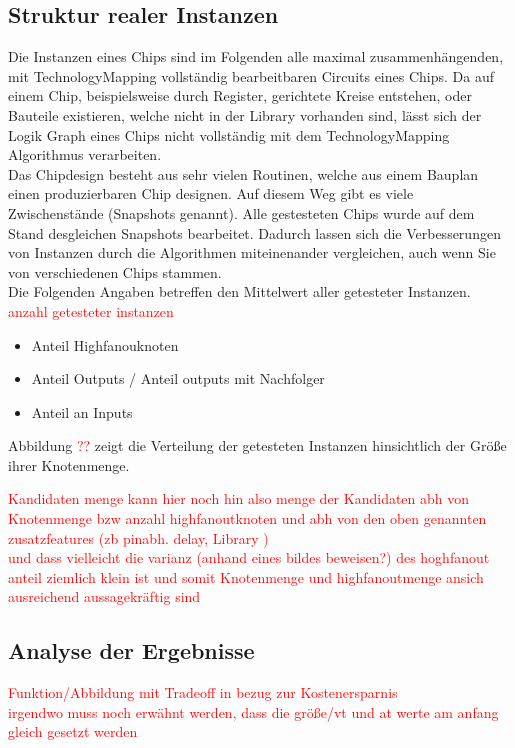 \documentclass[11pt, a4paper, german]{article}
\newcommand{\TM}{TechnologyMapping }
\begin{document}
 \subsection{Struktur realer Instanzen}
\label{subsec:struktur_realer_instanzen} 
 Die Instanzen eines Chips sind im Folgenden alle maximal zusammenhängenden, mit \TM vollständig bearbeitbaren Circuits eines Chips. Da auf einem Chip, beispielsweise durch Register, gerichtete Kreise entstehen, oder Bauteile existieren, welche nicht in der Library vorhanden sind, lässt sich der Logik Graph eines Chips nicht vollständig mit dem \TM Algorithmus verarbeiten. \\
 Das Chipdesign besteht aus sehr vielen Routinen, welche aus einem Bauplan einen produzierbaren Chip designen. Auf diesem Weg gibt es viele Zwischenstände (Snapshots genannt). Alle gestesteten Chips wurde auf dem Stand  desgleichen Snapshots bearbeitet. Dadurch lassen sich die Verbesserungen von Instanzen durch die Algorithmen miteinenander vergleichen, auch wenn Sie von verschiedenen Chips stammen.\\
 Die Folgenden Angaben betreffen den Mittelwert aller getesteter Instanzen. \\
 \textcolor{red}{anzahl getesteter instanzen}
 \begin{itemize}
 	\item Anteil Highfanouknoten 
 	\item Anteil Outputs / Anteil outputs mit Nachfolger
 	\item Anteil an Inputs
 \end{itemize}
 Abbildung \textcolor{red}{??} zeigt die Verteilung der getesteten Instanzen hinsichtlich der Größe  ihrer Knotenmenge.
 
\textcolor{red}{ Kandidaten menge kann hier noch hin also menge der Kandidaten abh von Knotenmenge bzw anzahl highfanoutknoten  und abh von den oben genannten zusatzfeatures (zb pinabh. delay, Library )  \\  und dass vielleicht die varianz (anhand eines bildes beweisen?) des hoghfanout anteil ziemlich klein ist und somit Knotenmenge und highfanoutmenge ansich ausreichend aussagekräftig sind} 
 
 \subsection{Analyse der Ergebnisse}
 \label{subsec:analyse_der_ergebnisse}
\textcolor{red}{Funktion/Abbildung mit Tradeoff in bezug zur Kostenersparnis \\ irgendwo muss noch erwähnt werden, dass die größe/vt und at werte am anfang gleich gesetzt werden }
 
\end{document}
